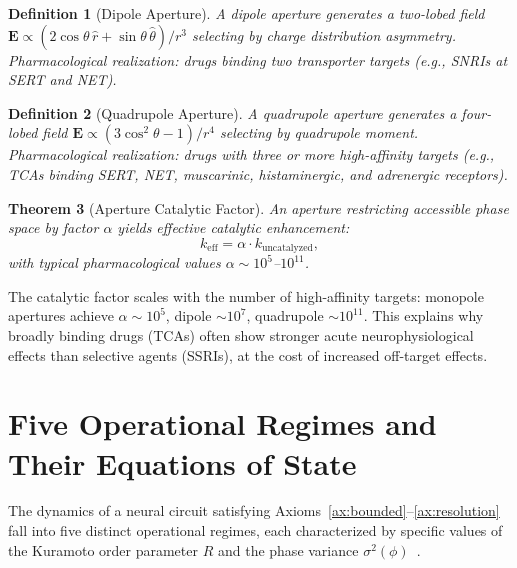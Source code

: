 \documentclass[twocolumn,10pt]{article}
\newtheorem{theorem}{Theorem}[section]
\newtheorem{definition}[theorem]{Definition}
\theoremstyle{remark}
\newcommand{\Rorder}{R}
\begin{document}
\begin{definition}[Dipole Aperture]
\label{def:dipole}
A dipole aperture generates a two-lobed field $\mathbf{E} \propto (2\cos\theta\,\hat{r} + \sin\theta\,\hat{\theta})/r^3$ selecting by charge distribution asymmetry. Pharmacological realization: drugs binding two transporter targets (e.g., SNRIs at SERT and NET).
\end{definition}

\begin{definition}[Quadrupole Aperture]
\label{def:quadrupole}
A quadrupole aperture generates a four-lobed field $\mathbf{E} \propto (3\cos^2\theta - 1)/r^4$ selecting by quadrupole moment. Pharmacological realization: drugs with three or more high-affinity targets (e.g., TCAs binding SERT, NET, muscarinic, histaminergic, and adrenergic receptors).
\end{definition}

\begin{theorem}[Aperture Catalytic Factor]
\label{thm:catalytic}
An aperture restricting accessible phase space by factor $\alpha$ yields effective catalytic enhancement:
\begin{equation}
  k_{\mathrm{eff}} = \alpha \cdot k_{\mathrm{uncatalyzed}},
\end{equation}
with typical pharmacological values $\alpha \sim 10^5$--$10^{11}$.
\end{theorem}

The catalytic factor scales with the number of high-affinity targets: monopole apertures achieve $\alpha \sim 10^5$, dipole $\sim 10^7$, quadrupole $\sim 10^{11}$. This explains why broadly binding drugs (TCAs) often show stronger acute neurophysiological effects than selective agents (SSRIs), at the cost of increased off-target effects.

\section{Five Operational Regimes and Their Equations of State}
\label{sec:regimes}

The dynamics of a neural circuit satisfying Axioms~\ref{ax:bounded}--\ref{ax:resolution} fall into five distinct operational regimes, each characterized by specific values of the Kuramoto order parameter $\Rorder$ and the phase variance $\sigma^2(\phi)$~\citep{kuramoto1984chemical,strogatz2000kuramoto}.
\end{document}
